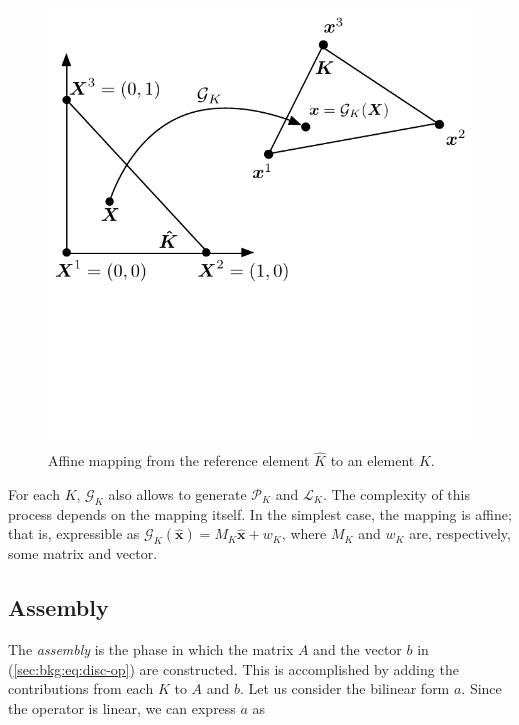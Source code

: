 \begin{figure}
\begin{CenteredBox}
\includegraphics[scale=0.8]{background/figures/reference-element}
\end{CenteredBox}
\caption{Affine mapping from the reference element $\hat{K}$ to an element $K$.}
\label{fig:bkg:reference-el}
\end{figure}

For each $K$, $\mathcal{G}_K$ also allows to generate $\mathcal{P}_K$ and $\mathcal{L}_K$.  The complexity of this process depends on the mapping itself. In the simplest case, the mapping is affine; that is, expressible as $\mathcal{G}_K(\hat{\boldsymbol{x}}) = M_K \hat{\boldsymbol{x}} + w_K$, where $M_K$ and $w_K$ are, respectively, some matrix and vector.


\subsection{Assembly}
\label{sec:bkg:assembly}
The {\em assembly} is the phase in which the matrix $A$ and the vector $b$ in (\ref{sec:bkg:eq:disc-op}) are constructed. This is accomplished by adding the contributions from each $K$ to $A$ and $b$. Let us consider the bilinear form $a$. Since the operator is linear, we can express $a$ as

